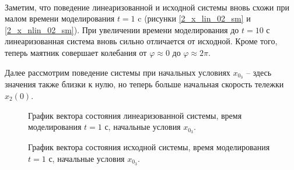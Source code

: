 \newpage
\,
\newpage



Заметим, что поведение линеаризованной и исходной системы вновь схожи при малом времени моделирования $t=1$ c (рисунки \ref{2_x_lin_02_sm} и \ref{2_x_nlin_02_sm}). При увеличении времени моделирования до $t=10$ с линеаризованная система вновь сильно отличается от исходной. Кроме того, теперь маятник совершает колебания от $\varphi \approx 0$ до $\varphi \approx 2 \pi$. 




Далее рассмотрим поведение системы при начальных условиях $x_{0_3}$ -- здесь значения также близки к нулю, но теперь больше начальная скорость тележки $x_2(0)$.

\begin{figure}[!h]
\caption{График вектора состояния линеаризованной системы, время моделирования $t=1$ с, начальные условия $x_{0_3}$.}
\label{2_x_lin_03_sm}
\end{figure}

\begin{figure}[!h]
\caption{График вектора состояния исходной системы, время моделирования $t=1$ с, начальные условия $x_{0_3}$.}
\label{2_x_nlin_03_sm}
\end{figure}

